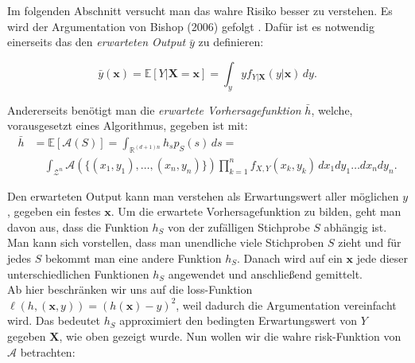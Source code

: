 Im folgenden Abschnitt versucht man das wahre Risiko besser zu verstehen. Es wird der Argumentation von Bishop (2006) gefolgt \cite{bishop}.
Daf\"ur ist es notwendig einerseits das den \textit{erwarteten Output} $\bar{y}$ zu definieren:

$$ \bar{y}(\mathbf{x}) = \mathbb{E}[Y|\mathbf{X}=\mathbf{x}] = \int_y y f_{Y|\mathbf{X}}(y|\mathbf{x}) \, dy.$$

Andererseits ben\"otigt man die \textit{erwartete Vorhersagefunktion} $\bar{h}$, welche, vorausgesetzt eines Algorithmus, gegeben ist mit:
\begin{equation*}
  \begin{split}
    \bar{h} & = \mathbb{E}[\mathcal{A}(S)] = \int_{\mathbb{R}^{(d+1)n}} h_s p_S(s)  \,ds = \\\
    & \quad \int_{\mathcal{Z}^n}\mathcal{A}(\{ (x_1, y_1), \dots ,(x_n, y_n)\}) \prod_{k=1}^n f_{X,Y}(x_k, y_k) \, dx_1 dy_1 \dots dx_n dy_n.
  \end{split}
\end{equation*}


Den erwarteten Output kann man verstehen als Erwartungswert aller m\"oglichen $y$, gegeben ein festes $\mathbf{x}$. 
Um die erwartete Vorhersagefunktion zu bilden, geht man davon aus, dass 
die Funktion $h_S$ von der zuf\"alligen Stichprobe $S$ abh\"angig ist. Man kann sich vorstellen, dass man unendliche viele Stichproben $S$ zieht und 
f\"ur jedes $S$ bekommt man eine andere Funktion $h_S$. Danach wird auf ein $\mathbf{x}$ jede dieser unterschiedlichen Funktionen $h_S$ angewendet und 
anschlie{\ss}end gemittelt. \\


Ab hier beschr\"anken wir uns auf die loss-Funktion $ \ell(h, (\mathbf{x},y)) = (h(\mathbf{x}) - y)^2 $, weil dadurch die Argumentation vereinfacht wird. 
Das bedeutet $h_S$ approximiert den bedingten Erwartungswert von 
$Y$ gegeben $\mathbf{X}$, wie oben gezeigt wurde. Nun wollen wir die wahre risk-Funktion von $\mathcal{A}$ betrachten:

